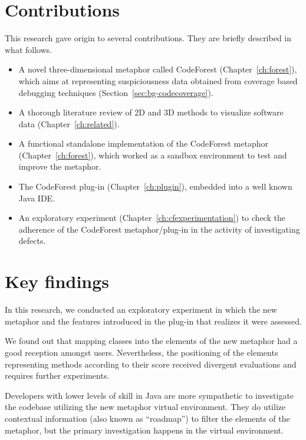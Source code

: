 \section{Contributions}
This research gave origin to several contributions. They are briefly described
in what follows.

\begin{itemize}
    \item A novel three-dimensional metaphor called CodeForest
    (Chapter~\ref{ch:forest}), which aims at representing suspiciousness data
    obtained from coverage based debugging techniques
    (Section~\ref{sec:bg-codecoverage}).

    \item A thorough literature review of 2D and 3D methods to visualize
    software data (Chapter~\ref{ch:related}).

    \item A functional standalone implementation of the CodeForest metaphor
    (Chapter~\ref{ch:forest}), which worked as a sandbox environment to test and
    improve the metaphor.

    \item The CodeForest plug-in (Chapter~\ref{ch:plugin}), embedded into a
    well known Java IDE.

    \item An exploratory experiment (Chapter~\ref{ch:cfexperimentation}) to
    check the adherence of the CodeForest metaphor/plug-in in the activity of
    investigating defects.
\end{itemize}

\section{Key findings}

In this research, we conducted an exploratory experiment in which the new
metaphor and the features introduced in the plug-in that realizes it were assessed.

We found out that mapping classes into the elements of the new metaphor had a
good reception amongst users. Nevertheless, the positioning of the elements
representing methods according to their score received divergent evaluations and
requires further experiments.

Developers with lower levels of skill in Java are more sympathetic to
investigate the codebase utilizing the new metaphor virtual environment. They do
utilize contextual information (also known as ``roadmap'') to filter the
elements of the metaphor, but the primary investigation happens in the virtual
environment.

